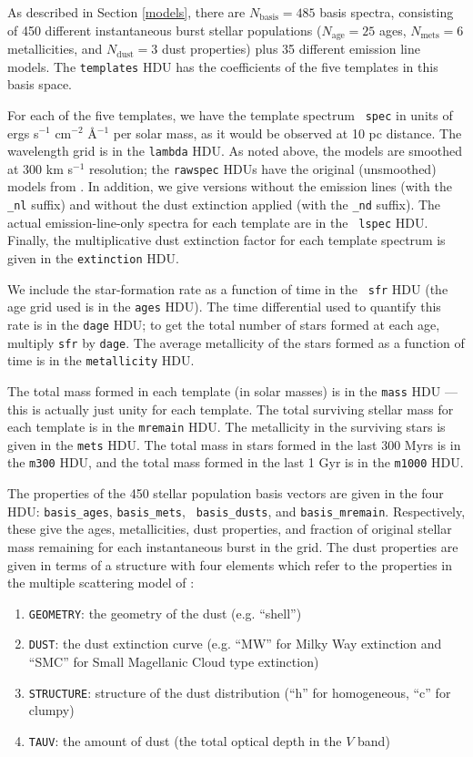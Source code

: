 \documentclass[10pt,preprint]{aastex}
\begin{document}
As described in Section \ref{models}, there are $N_{\mathrm{basis}} =
485$ basis spectra, consisting of 450 different instantaneous burst
stellar populations ($N_{\mathrm{age}} = 25$ ages, $N_{\mathrm{mets}}
= 6$ metallicities, and $N_{\mathrm{dust}}=3$ dust properties) plus 35
different emission line models. The {\tt templates} HDU has the
coefficients of the five templates in this basis space. 

For each of the five templates, we have the template spectrum {\tt
spec} in units of ergs s$^{-1}$ cm$^{-2}$ \AA$^{-1}$ per solar mass,
as it would be observed at 10 pc distance. The wavelength grid is in
the {\tt lambda} HDU. As noted above, the models are smoothed at 300
km s$^{-1}$ resolution; the {\tt rawspec} HDUs have the original
(unsmoothed) models from \citet{bruzual03a}. In addition, we give
versions without the emission lines (with the {\tt \_nl} suffix) and
without the dust extinction applied (with the {\tt \_nd} suffix). The
actual emission-line-only spectra for each template are in the {\tt
lspec} HDU. Finally, the multiplicative dust extinction factor for
each template spectrum is given in the {\tt extinction} HDU.

We include the star-formation rate as a function of time in the {\tt
sfr} HDU (the age grid used is in the {\tt ages} HDU). The time
differential used to quantify this rate is in the {\tt dage} HDU; to
get the total number of stars formed at each age, multiply {\tt sfr}
by {\tt dage}. The average metallicity of the stars formed as a
function of time is in the {\tt metallicity} HDU.

The total mass formed in each template (in solar masses) is in the
{\tt mass} HDU --- this is actually just unity for each template. The
total surviving stellar mass for each template is in the {\tt mremain}
HDU. The metallicity in the surviving stars is given in the {\tt mets}
HDU.  The total mass in stars formed in the last 300 Myrs is in the
{\tt m300} HDU, and the total mass formed in the last 1 Gyr is in the
{\tt m1000} HDU.

The properties of the 450 stellar population basis vectors are given
in the four HDU: {\tt basis\_ages}, {\tt basis\_mets}, {\tt
basis\_dusts}, and {\tt basis\_mremain}. Respectively, these give the
ages, metallicities, dust properties, and fraction of original stellar
mass remaining for each instantaneous burst in the grid. The dust 
properties are given in terms of a structure with four elements which
refer to the properties in the multiple scattering model of \citet{witt00a}:
\begin{enumerate}
\item {\tt GEOMETRY}: the geometry of the dust (e.g. ``shell'') 
\item {\tt DUST}: the dust extinction curve (e.g. ``MW'' for Milky
	Way extinction and ``SMC'' for Small Magellanic Cloud type
	extinction) 
\item {\tt STRUCTURE}: structure of the dust distribution (``h'' for
	homogeneous, ``c'' for clumpy)
\item {\tt TAUV}: the amount of dust (the total optical depth in the
	$V$ band)
\end{enumerate}

\newpage




\end{document}
